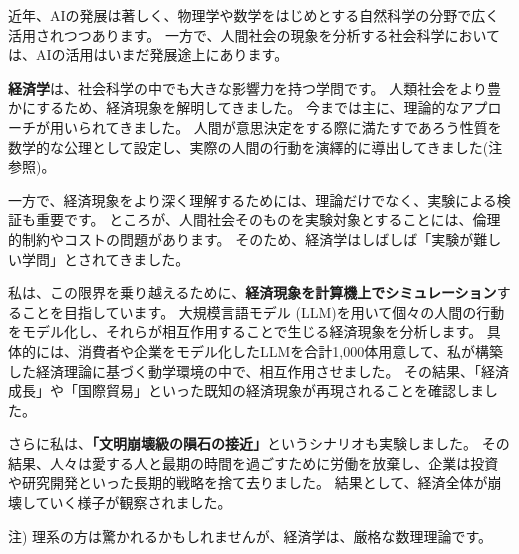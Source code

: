 近年、AIの発展は著しく、物理学や数学をはじめとする自然科学の分野で広く活用されつつあります。
一方で、人間社会の現象を分析する社会科学においては、AIの活用はいまだ発展途上にあります。

\textbf{経済学}は、社会科学の中でも大きな影響力を持つ学問です。
人類社会をより豊かにするため、経済現象を解明してきました。
今までは主に、理論的なアプローチが用いられてきました。
人間が意思決定をする際に満たすであろう性質を数学的な公理として設定し、実際の人間の行動を演繹的に導出してきました(注参照)。

一方で、経済現象をより深く理解するためには、理論だけでなく、実験による検証も重要です。
ところが、人間社会そのものを実験対象とすることには、倫理的制約やコストの問題があります。
そのため、経済学はしばしば「実験が難しい学問」とされてきました。

私は、この限界を乗り越えるために、\textbf{経済現象を計算機上でシミュレーション}することを目指しています。
大規模言語モデル (LLM)を用いて個々の人間の行動をモデル化し、それらが相互作用することで生じる経済現象を分析します。
具体的には、消費者や企業をモデル化したLLMを合計1,000体用意して、私が構築した経済理論に基づく動学環境の中で、相互作用させました。
その結果、「経済成長」や「国際貿易」といった既知の経済現象が再現されることを確認しました。

さらに私は、\textbf{「文明崩壊級の隕石の接近」}というシナリオも実験しました。
その結果、人々は愛する人と最期の時間を過ごすために労働を放棄し、企業は投資や研究開発といった長期的戦略を捨て去りました。
結果として、経済全体が崩壊していく様子が観察されました。


\begin{flushright}
注) 理系の方は驚かれるかもしれませんが、経済学は、厳格な数理理論です。
\end{flushright}
